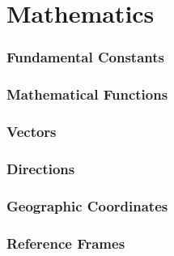 \part{Mathematics}
	\section{Fundamental Constants}
	\section{Mathematical Functions}
	\section{Vectors}
	\section{Directions}
	\section{Geographic Coordinates}
	\section{Reference Frames}